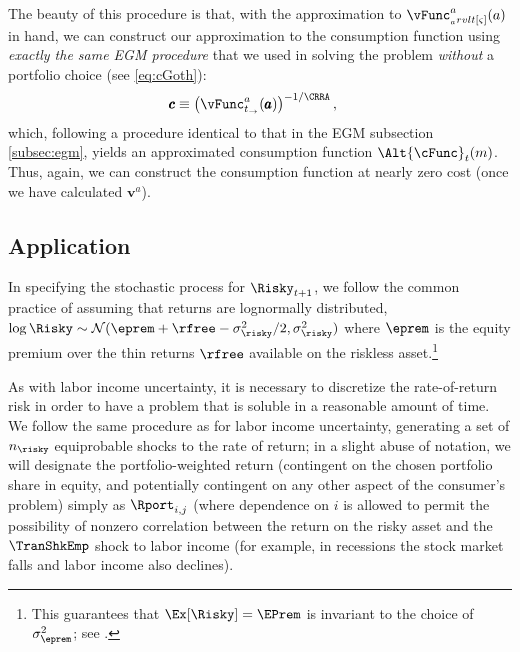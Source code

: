 The beauty of this procedure is that, with the approximation to $\vFunc_{_arvlt[\varsigma]}^{a}(a)$ in hand, we can construct our approximation to the consumption function using \emph{exactly the same EGM procedure} that we used in solving the problem \emph{without} a portfolio choice (see \eqref{eq:cGoth}):
\begin{equation}\begin{gathered}\begin{aligned}
      \pmb{c}  & \equiv  \left(\vFunc^{a}_{t_\rightarrow}(\pmb{a})\right)^{-1/\CRRA} \label{eq:cVecPort},
    \end{aligned}\end{gathered}\end{equation}
which, following a procedure identical to that in the EGM subsection \ref{subsec:egm}, yields an approximated consumption function $\Alt{\cFunc}_{t}({m})$.  Thus, again, we can construct the consumption function at nearly zero cost (once we have calculated $\pmb{v}^{a}$).

\subsection{Application}\label{subsec:MCApplication}

In specifying the stochastic process for $\Risky_{t+1}$, we follow the common practice of assuming that returns are lognormally distributed, $\log \Risky \sim \mathcal{N}(\eprem+\rfree-\sigma^{2}_{\risky}/2,\sigma^{2}_{\risky})$ where $\eprem$ is the equity premium over the thin returns $\rfree$ available on the riskless asset.\footnote{This guarantees that $\Ex[\Risky] = \EPrem$ is invariant to the choice of $\sigma^{2}_{\eprem}$; see .}

As with labor income uncertainty, it is necessary to discretize the rate-of-return risk in order to have a problem that is soluble in a reasonable amount of time.  We follow the same procedure as for labor income uncertainty, generating a set of $n_{\risky}$ equiprobable shocks to the rate of return; in a slight abuse of notation, we will designate the portfolio-weighted return (contingent on the chosen portfolio share in equity, and potentially contingent on any other aspect of the consumer's problem) simply as $\Rport_{i,j}$ (where dependence on $i$ is allowed to permit the possibility of nonzero correlation between the return on the risky asset and the $\TranShkEmp$ shock to labor income (for example, in recessions the stock market falls and labor income also declines).


